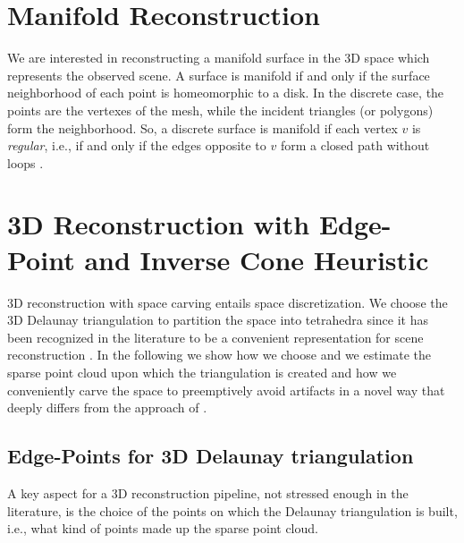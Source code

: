 \section{Manifold Reconstruction}%
\label{sec:manifold}
We are interested in reconstructing a manifold surface in the 3D space which represents the observed scene.
A surface is manifold if and only if the surface neighborhood of each point is homeomorphic to a disk.
In the discrete case, the points are the vertexes of the mesh, while the incident triangles (or polygons) form the neighborhood. 
So, a discrete surface is manifold if each vertex $v$ is \emph{regular}, i.e., if and only if the edges opposite to $v$ form a closed path without loops \cite{lhuillier_Yu2013}. 



\section{3D Reconstruction with Edge-Point and Inverse Cone Heuristic}
\label{sec:3D-Reconstruction}
3D reconstruction with space carving entails space discretization.
We choose the 3D Delaunay triangulation to partition the space into tetrahedra since it has been recognized in the literature to be a convenient representation for scene reconstruction \cite{litvinov_lhuillier_13, Pan_et_al09, labatut2007efficient, lovi_et_al_11}.
In the following we show how we choose and we estimate the sparse point cloud upon which the triangulation is created and how we conveniently carve the space to preemptively avoid artifacts in a novel way that deeply differs from the approach of \cite{litvinov_Lhiuller14}.

\subsection{Edge-Points for 3D Delaunay triangulation}
\label{subsec:pcl_estimation}
A key aspect for a 3D reconstruction pipeline, not stressed enough in the literature, is the choice of the points on which the Delaunay triangulation is built, i.e., what kind of points made up the sparse point cloud.

